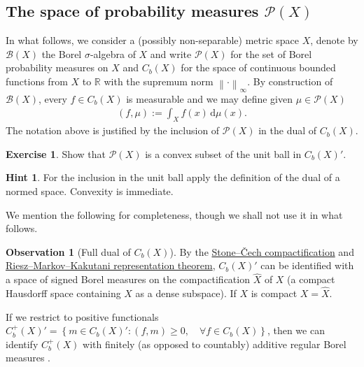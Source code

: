 \documentclass[
    a4paper,
    DIV=14,
    abstract=true,
    numbers=noenddot
]
{scrartcl}
\theoremstyle{definition}
\newtheorem{observation}{Observation}
\newtheorem{exercise}{Exercise}
\newtheorem*{hint}{Hint}
\newcommand{\wh}[1]{\widehat{#1}}
\newcommand{\set}[1]{\left\{#1\right\}}
\renewcommand{\norm}[1]{\left\lVert #1 \right\rVert}\renewcommand{\abs}[1]{\left| #1 \right|}
\renewcommand{\d}{\,\mathrm{d}}\newcommand{\dx}{\,\mathrm{d}x}
\newcommand{\R}{\mathbb{R}}
\newcommand{\Bb}{\mathcal{B}}
\newcommand{\Pp}{\mathcal{P}}
\begin{document}
\subsection{The space of probability measures $\Pp (X)$}
In what follows, we consider a (possibly non-separable) metric space $X$, denote by $\Bb (X)$ the Borel $\sigma $-algebra of $X$ and write $\Pp (X)$ for the set of Borel probability measures on $X$ and $C_b(X)$ for the space of continuous bounded functions from $X$ to $\R$ with the supremum norm $\norm{\cdot }_\infty$. By construction of $\Bb (X)$, every $f \in C_b(X)$ is measurable and we may define given $\mu \in \Pp (X)$
\begin{align*}
    (f,\mu):=\int_{X}f(x)\d \mu (x).
\end{align*}
The notation above is justified by the inclusion of $\Pp (X)$  in the dual of $C_b(X)$.
\begin{exercise}
    Show that $\Pp (X)$  is a convex subset of the unit ball in $C_b(X)'$.
\end{exercise}
\begin{hint}
    For the inclusion in the unit ball apply the definition of the dual of a normed space. Convexity is immediate.
\end{hint}
We mention the following for completeness, though we shall not use it in what follows.
\begin{observation}[Full dual of $C_b(X)$]
    By the \href{https://en.wikipedia.org/wiki/Stone%E2%80%93%C4%8Cech_compactification#Universal_property_and_functoriality}{Stone--Čech compactification} and \href{https://en.wikipedia.org/wiki/Riesz%E2%80%93Markov%E2%80%93Kakutani_representation_theorem}{Riesz--Markov--Kakutani representation theorem}, $C_b(X)'$  can be identified with a space of signed Borel measures on the compactification $\wh{X}$  of $X$ (a compact Hausdorff space containing $X$ as a dense subspace). If $X$ is compact $X= \wh{X}$. 

    If we restrict to positive functionals $C_b^+(X)'= \set{m \in C_b(X)' : (f, m) \geq 0 , \quad\forall f \in C_b(X)}$, then we can identify $C_b^+(X)$ with finitely (as opposed to countably) additive  regular Borel measures \cite[Theorem 5.7 p. 35]{parthasarathy1967probability}.
\end{observation}
\end{document}
